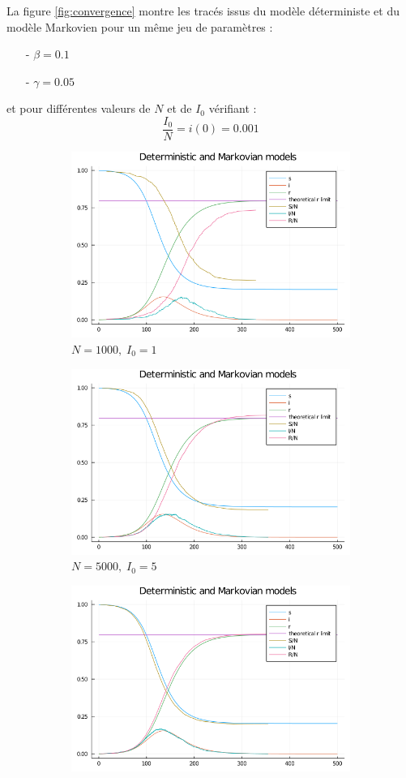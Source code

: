 \documentclass[12pt]{extarticle}
\begin{document}
La figure \ref{fig:convergence} montre les tracés issus du modèle déterministe et du modèle Markovien pour un même jeu de paramètres : 
\begin{itemize}
    \item[-] $\beta = 0.1$
    \item[-] $\gamma = 0.05$
\end{itemize}
et pour différentes valeurs de $N$ et de $I_0$ vérifiant : 
$$\frac{I_0}{N} = i(0) = 0.001$$

\begin{figure}[h!]
    \begin{subfigure}{.5\textwidth}
        \includegraphics[width=0.8\linewidth]{figures/figureN_1000_initialI_1.png}
        \caption{$N = 1000, \; I_0 = 1$}
    \end{subfigure}
    \begin{subfigure}{.5\textwidth}
        \includegraphics[width=0.8\linewidth]{figures/figureN_5000_initialI_5.png}
        \caption{$N = 5000, \; I_0 = 5$}
    \end{subfigure}
    \begin{subfigure}{.5\textwidth}
        \includegraphics[width=0.8\linewidth]{figures/figureN_10000_initialI_10.png}

\end{subfigure}
\end{figure}
\end{document}

